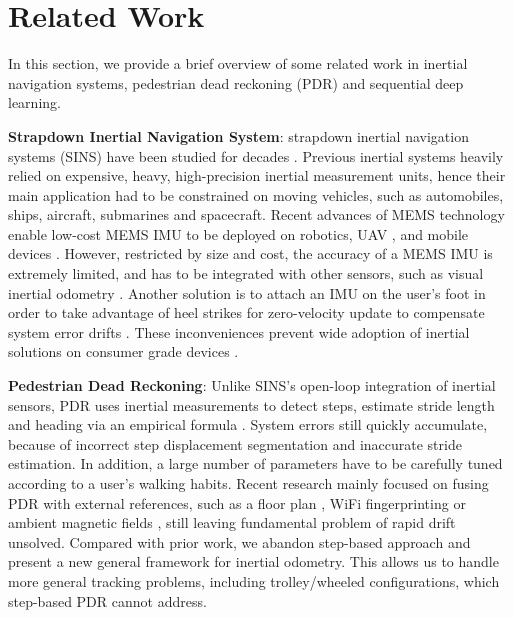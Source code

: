 \documentclass[letterpaper]{article}
\begin{document}
\section{Related Work}

	In this section, we provide a brief overview of some related work in inertial navigation systems, pedestrian dead reckoning (PDR) and sequential deep learning. 
    
    \textbf{Strapdown Inertial Navigation System}: strapdown inertial navigation systems (SINS) have been studied for decades \cite{Savage1998}. Previous inertial systems heavily relied on expensive, heavy, high-precision inertial measurement units, hence their main application had to be constrained on moving vehicles, such as automobiles, ships, aircraft, submarines and spacecraft. Recent advances of MEMS technology enable low-cost MEMS IMU to be deployed on robotics, UAV \cite{Bloesch2015}, and mobile devices \cite{Lymberopoulos2015}. However, restricted by size and cost, the accuracy of a MEMS IMU is extremely limited, and has to be integrated with other sensors, such as visual inertial odometry \cite{Leutenegger2015}. Another solution is to attach an IMU on the user's foot in order to take advantage of heel strikes for zero-velocity update to compensate system error drifts \cite{Skog2010}. These inconveniences prevent wide adoption of inertial solutions on consumer grade devices \cite{Harle2013}. 
    
    \textbf{Pedestrian Dead Reckoning}: Unlike SINS's open-loop integration of inertial sensors, PDR uses inertial measurements to detect steps, estimate stride length and heading via an empirical formula \cite{Shu2015a}. System errors still quickly accumulate, because of incorrect step displacement segmentation and inaccurate stride estimation. In addition, a large number of parameters have to be carefully tuned according to a user's walking habits. Recent research mainly focused on fusing PDR with external references, such as a floor plan \cite{Xiao2014a}, WiFi fingerprinting \cite{Hilsenbeck2014} or ambient magnetic fields \cite{Wang2016a}, still leaving fundamental problem of rapid drift unsolved. Compared with prior work, we abandon step-based approach and present a new general framework for inertial odometry. This allows us to handle  more general tracking problems, including trolley/wheeled configurations, which step-based PDR cannot address.
    
\end{document}
